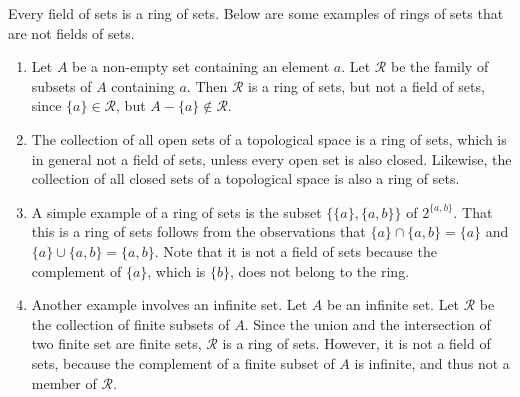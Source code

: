 \documentclass[12pt]{article}
\begin{document}
Every field of sets is a ring of sets.  Below are some examples of rings of sets that are not fields of sets.

\begin{enumerate}
\item Let $A$ be a non-empty set containing an element $a$.  Let $\mathcal{R}$ be the family of subsets of $A$ containing $a$.  Then $\mathcal{R}$ is a ring of sets, but not a field of sets, since $\lbrace a\rbrace \in \mathcal{R}$, but $A-\lbrace a\rbrace \notin \mathcal{R}$.
\item The collection of all open sets of a topological space is a ring of sets, which is in general not a field of sets, unless every open set is also closed.  Likewise, the collection of all closed sets of a topological space is also a ring of sets.
\item
A simple example of a ring of sets is the subset $\{ \{a\}, \{a,b\} \}$
of $2^{\{a,b\}}$.  That this is a ring of sets follows from the
observations that $\{a\} \cap \{a,b\} = \{a\}$ and $\{a\} \cup \{a,b\}
= \{a,b\}$.  Note that it is not a field of sets because the
complement of $\{a\}$, which is $\{b\}$, does not belong to the ring.
\item
Another example involves an infinite set.  Let $A$ be an infinite set.  Let $\mathcal{R}$ be the collection of finite subsets of $A$.  Since the union and the intersection of two finite set are finite sets, $\mathcal{R}$ is a ring of sets.  However, it is not a field of sets, because the complement of a finite subset of $A$ is infinite, and thus not a member of $\mathcal{R}$.
\end{enumerate}
\end{document}
